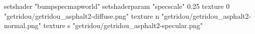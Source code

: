 setshader "bumpspecmapworld"
setshaderparam "specscale" 0.25
texture 0 "getridou/getridou_asphalt2-diffuse.png"
texture n "getridou/getridou_asphalt2-normal.png"
texture s "getridou/getridou_asphalt2-specular.png"